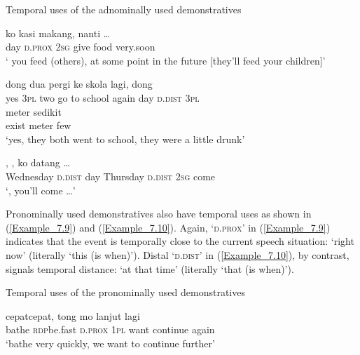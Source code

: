 {\begin{styleExampleTitle}
Temporal uses of the adnominally used demonstratives
\end{styleExampleTitle}

\ea
\label{Example_7.6}
 {} {ko} {kasi} {makang,} {nanti} {\ldots}\\ %
 day  \textsc{d.prox}  \textsc{2sg}  give  food  very.soon  \\
 ‘ you feed (others), at some point in the future [they’ll feed your children]’ \textstyleExampleSource{[081110-008-CvNP.0254]}
\z

\ea
\label{Example_7.7}
 {{dong}} {{dua}} {pergi} {ke} {skola} {lagi,} {} {} {dong}\\ %
 yes  {\textsc{3pl}}  {two}  go  to  school  again  day  \textsc{d.dist}  \textsc{3pl}\\
  {meter}  {sedikit}\\
 {exist}  {meter}  {few}\\
\glt 
‘yes, they both went to school,  they were a little drunk’ \textstyleExampleSource{[081115-001a-Cv.0038]}
\z

\ea
\label{Example_7.8}
 {,} {} {} {,} {ko} {datang} {\ldots}\\ %
 Wednesday  \textsc{d.dist}  day  Thursday  \textsc{d.dist}  \textsc{2sg}  come  \\
\glt 
‘, you’ll come \ldots’ \textstyleExampleSource{[081011-005-Cv.0001]}
\z



Pronominally used demonstratives also have temporal uses as shown in (\ref{Example_7.9}) and (\ref{Example_7.10}). Again,  ‘\textsc{d.prox}’ in (\ref{Example_7.9}) indicates that the event is temporally close to the current speech situation:  ‘right now’ (literally ‘this (is when)’). Distal  ‘\textsc{d.dist}’ in (\ref{Example_7.10}), by contrast, signals temporal distance:  ‘at that time’ (literally ‘that (is when)’).


\begin{styleExampleTitle}
Temporal uses of the pronominally used demonstratives
\end{styleExampleTitle}

\ea
\label{Example_7.9}
 {cepat{\Tilde}cepat,} {} {tong} {mo} {lanjut} {lagi}\\ %
 bathe  \textsc{rdp}{\Tilde}be.fast  \textsc{d.prox}  \textsc{1pl}  want  continue  again\\
\glt 
‘bathe very quickly,  we want to continue further’ \textstyleExampleSource{[080917-008-NP.0134]}
\z

}
